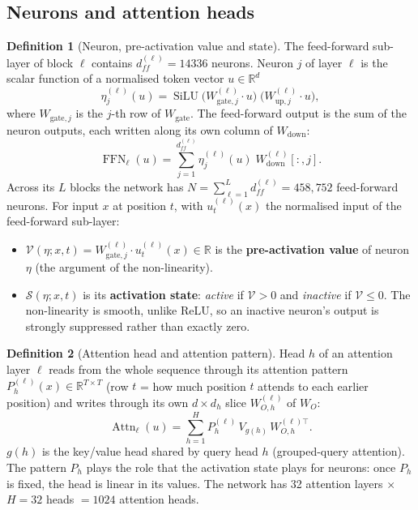 \documentclass[10pt,a4paper]{article}
\newcommand{\op}[1]{\operatorname{#1}}
\theoremstyle{definition}
\newtheorem{definition}{Definition}[section]
\begin{document}
\subsection{Neurons and attention heads}
\begin{definition}[Neuron, pre-activation value and state]
The feed-forward sub-layer of block $\ell$ contains $d_{ff}^{(\ell)}=14336$ neurons. Neuron $j$ of layer $\ell$ is the scalar function of a normalised token vector $u\in\mathbb{R}^{d}$
\begin{equation}
  \eta^{(\ell)}_j(u) = \op{SiLU}\big(W^{(\ell)}_{\mathrm{gate},j}\cdot u\big)\;\big(W^{(\ell)}_{\mathrm{up},j}\cdot u\big),
\end{equation}
where $W_{\mathrm{gate},j}$ is the $j$-th row of $W_{\mathrm{gate}}$. The feed-forward output is the sum of the neuron outputs, each written along its own column of $W_{\mathrm{down}}$:
\begin{equation}
  \op{FFN}_\ell(u) = \sum_{j=1}^{d_{ff}^{(\ell)}} \eta^{(\ell)}_j(u)\;W^{(\ell)}_{\mathrm{down}}[:,j].
\end{equation}
Across its $L$ blocks the network has $N=\sum_{\ell=1}^{L} d_{ff}^{(\ell)}=458{,}752$ feed-forward neurons. For input $x$ at position $t$, with $u^{(\ell)}_t(x)$ the normalised input of the feed-forward sub-layer:
\begin{itemize}
\item $\mathcal{V}(\eta;x,t)=W^{(\ell)}_{\mathrm{gate},j}\cdot u^{(\ell)}_t(x)\in\mathbb{R}$ is the \textbf{pre-activation value} of neuron $\eta$ (the argument of the non-linearity).
\item $\mathcal{S}(\eta;x,t)$ is its \textbf{activation state}: \emph{active} if $\mathcal{V}>0$ and \emph{inactive} if $\mathcal{V}\le 0$. The non-linearity is smooth, unlike ReLU, so an inactive neuron's output is strongly suppressed rather than exactly zero.
\end{itemize}
\end{definition}
\begin{definition}[Attention head and attention pattern]
Head $h$ of an attention layer $\ell$ reads from the whole sequence through its attention pattern $P^{(\ell)}_h(x)\in\mathbb{R}^{T\times T}$ (row $t$ = how much position $t$ attends to each earlier position) and writes through its own $d\times d_h$ slice $W^{(\ell)}_{O,h}$ of $W_O$:
\begin{equation}
  \op{Attn}_\ell(u) = \sum_{h=1}^{H} P^{(\ell)}_h\,V_{g(h)}\,W^{(\ell)\top}_{O,h}.
\end{equation}
$g(h)$ is the key/value head shared by query head $h$ (grouped-query attention). The pattern $P_h$ plays the role that the activation state plays for neurons: once $P_h$ is fixed, the head is linear in its values. The network has 32 attention layers $\times$ $H=32$ heads $=1024$ attention heads.
\end{definition}
\end{document}
